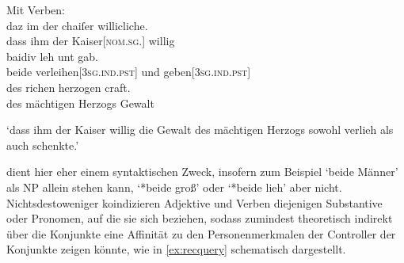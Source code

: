 \begin{exe}
\begin{xlist}
	\ex \label{ex:konjvb}
		Mit Verben:\\
		\gll daz im der chaiſer willicliche. \\
			dass ihm der Kaiser[\textsc{nom.sg.\MascM}] willig \\
	\sn	\gll baidiv leh unt gab. \\
			beide verleihen[\textsc{3sg\subM.ind.pst}] und
			geben[\textsc{3sg\subM.ind.pst}] \\
	\sn	\gll des richen herzogen craft. \\
			des mächtigen Herzogs Gewalt \\
		\begin{taggedline}{\parencites[\pno~73ra,19--21]{kc:A1}[vgl.][17108--17110]{schroeder1895}}
		\trans `dass ihm der Kaiser willig die Gewalt des mächtigen Herzogs sowohl verlieh als auch schenkte.'
		\end{taggedline}
	\end{xlist}
\end{exe}

 dient hier eher einem syntaktischen Zweck, insofern zum
Beispiel  `beide Männer' als NP allein stehen kann,
 `*beide groß' oder
 `*beide lieh' aber nicht.
Nichtsdestoweniger koindizieren Adjektive und Verben diejenigen Substantive
oder Pronomen, auf die sie sich beziehen, sodass  zumindest
theoretisch indirekt über die Konjunkte eine Affinität zu den Personenmerkmalen
der Controller der Konjunkte zeigen könnte, wie in \cref{ex:recquery}
schematisch dargestellt.

